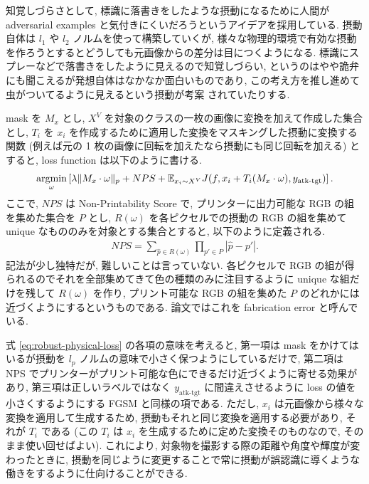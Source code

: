 知覚しづらさとして, 標識に落書きをしたような摂動になるために人間が adversarial examples と気付きにくいだろうというアイデアを採用している.
摂動自体は $l_1$ や $l_2$ ノルムを使って構築していくが, 様々な物理的環境で有効な摂動を作ろうとするとどうしても元画像からの差分は目につくようになる.
標識にスプレーなどで落書きをしたように見えるので知覚しづらい, というのはやや詭弁にも聞こえるが発想自体はなかなか面白いものであり, この考え方を推し進めて虫がついてるように見えるという摂動が考案 \cite{yakura2019generate} されていたりする.

mask を $M_x$ とし, $X^V$ を対象のクラスの一枚の画像に変換を加えて作成した集合とし, $T_i$ を $x_i$ を作成するために適用した変換をマスキングした摂動に変換する関数 (例えば元の 1 枚の画像に回転を加えたなら摂動にも同じ回転を加える) とすると, loss function は以下のように書ける.
%
\begin{eqnarray}
\mathop{\rm argmin}\limits_{\omega} \left[ \lambda \| M_x \cdot \omega \|_p + NPS + \mathbb{E}_{x_i \sim X^V} J (f, x_i + T_i (M_x \cdot \omega), y_{\text{atk-tgt}}) \right].
\label{eq:robust-physical-loss}
\end{eqnarray}
%
ここで, $NPS$ は Non-Printability Score で, プリンターに出力可能な RGB の組を集めた集合を $P$ とし, $R(\omega)$ を各ピクセルでの摂動の RGB の組を集めて unique なもののみを対象とする集合とすると, 以下のように定義される.
%
\begin{eqnarray}
NPS = \sum_{\hat{p} \in R(\omega)} \prod_{p' \in P} |\hat{p} - p'|.
\label{eq:nps}
\end{eqnarray}
%
記法が少し独特だが, 難しいことは言っていない.
各ピクセルで RGB の組が得られるのでそれを全部集めてきて色の種類のみに注目するように unique な組だけを残して $R(\omega)$ を作り, プリント可能な RGB の組を集めた $P$ のどれかには近づくようにするというものである.
論文ではこれを fabrication error と呼んでいる.

式 \ref{eq:robust-physical-loss} の各項の意味を考えると, 第一項は mask をかけてはいるが摂動を $l_p$ ノルムの意味で小さく保つようにしているだけで, 第二項は NPS でプリンターがプリント可能な色にできるだけ近づくように寄せる効果があり, 第三項は正しいラベルではなく $y_{\text{atk-tgt}}$ に間違えさせるように loss の値を小さくするようにする FGSM と同様の項である.
ただし, $x_i$ は元画像から様々な変換を適用して生成するため, 摂動もそれと同じ変換を適用する必要があり, それが $T_i$ である (この $T_i$ は $x_i$ を生成するために定めた変換そのものなので, そのまま使い回せばよい).
これにより, 対象物を撮影する際の距離や角度や輝度が変わったときに, 摂動を同じように変更することで常に摂動が誤認識に導くような働きをするように仕向けることができる.

